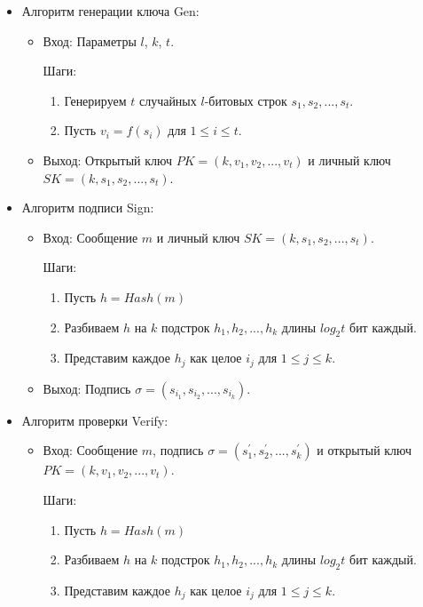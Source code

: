 \documentclass[a4paper, 14pt]{extarticle}
\begin{document}
\begin{itemize}
    \item Алгоритм генерации ключа Gen:

    \begin{itemize}
        \item Вход: Параметры $l$, $k$, $t$.

        Шаги:
        \begin{enumerate}
            \item Генерируем $t$ случайных $l$-битовых строк $s_{1}, s_{2}, ..., s_{t}$.
            \item Пусть $v_{i} = f(s_{i})$ для $1 \leq i \leq t$.
        \end{enumerate}

        \item Выход: Открытый ключ $PK = (k, v_{1}, v_{2}, ..., v_{t})$ и личный ключ $SK = (k, s_{1}, s_{2}, ..., s_{t})$.
    \end{itemize}

    \item Алгоритм подписи Sign:

    \begin{itemize}
        \item Вход: Сообщение $m$ и личный ключ $SK = (k, s_{1}, s_{2}, ..., s_{t})$.

        Шаги:
        \begin{enumerate}
            \item Пусть $h = Hash(m)$
            \item Разбиваем $h$ на $k$ подстрок $h_{1}, h_{2}, ..., h_{k}$ длины $log_{2}t$ бит каждый.
            \item Представим каждое $h_{j}$ как целое $i_{j}$ для $1 \leq j \leq k$.
        \end{enumerate}

        \item Выход: Подпись $\sigma = (s_{i_{1}}, s_{i_{2}}, ..., s_{i_{k}})$.
    \end{itemize}

    \item Алгоритм проверки Verify:

    \begin{itemize}
        \item Вход: Сообщение $m$, подпись $\sigma = (s^{'}_{1}, s^{'}_{2}, ..., s^{'}_{k})$ и открытый ключ $PK = (k, v_{1}, v_{2}, ..., v_{t})$.

        Шаги:
        \begin{enumerate}
            \item Пусть $h = Hash(m)$
            \item Разбиваем $h$ на $k$ подстрок $h_{1}, h_{2}, ..., h_{k}$ длины $log_{2}t$ бит каждый.
            \item Представим каждое $h_{j}$ как целое $i_{j}$ для $1 \leq j \leq k$.
        \end{enumerate}


\end{itemize}
\end{itemize}
\end{document}
